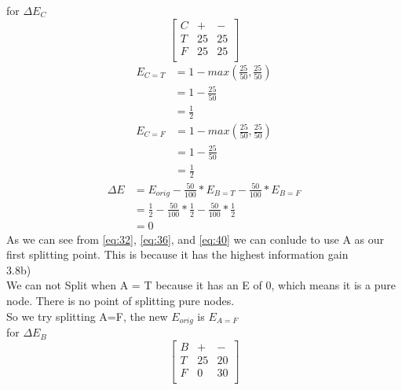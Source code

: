 \documentclass[12pt,english]{article}
\begin{document}
for $\Delta E_{C}$\\
\begin{equation*}\tag{10}\label{eq:37}
\begin{bmatrix} C & + & - \\T & 25 &  25 \\F & 25 & 25 \\ \end{bmatrix}
\end{equation*}
\begin{equation*}\tag{11}\label{eq:38}
\begin{split}
E_{C=T} &= 1 - max(\frac{25}{50},\frac{25}{50})\\
&=1 - \frac{25}{50}\\
&=\frac{1}{2}
\end{split}
\end{equation*}
\begin{equation*}\tag{13}\label{eq:39}
\begin{split}
E_{C=F} &= 1 - max(\frac{25}{50},\frac{25}{50})\\
&=1 - \frac{25}{50}\\
&=\frac{1}{2}
\end{split}
\end{equation*}
\begin{equation*}\tag{14}\label{eq:40}
\begin{split}
\Delta E &= E_{orig} - \frac{50}{100} * E_{B=T} - \frac{50}{100} * E_{B=F}\\
&= \frac{1}{2} -\frac{50}{100} *\frac{1}{2} - \frac{50}{100} *\frac{1}{2}\\
&= 0
\end{split}
\end{equation*}
As we can see from \eqref{eq:32}, \eqref{eq:36}, and \eqref{eq:40} we can conlude to use A as our first splitting point. This is because it has the highest information gain\\
3.8b)\\
We can not Split when A = T because it has an E of 0, which means it is a pure node. There is no point of splitting pure nodes.\\
So we try splitting A=F, the new $E_{orig}$ is $E_{A=F}$\\
for $\Delta E_{B}$\\
\begin{equation*}\tag{1}\label{eq:41}
\begin{bmatrix} B & + & - \\T & 25 &  20 \\F & 0 & 30 \\ \end{bmatrix}
\end{equation*}
\end{document}
